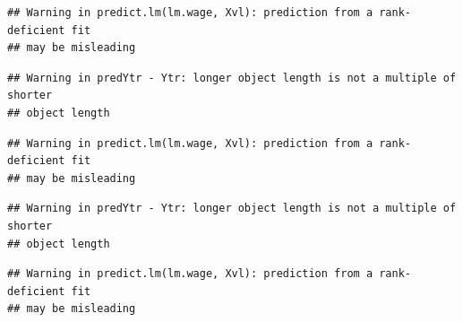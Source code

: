 \documentclass[]{article}
\newenvironment{Shaded}{\begin{snugshade}}{\end{snugshade}}
\newcommand{\KeywordTok}[1]{\textcolor[rgb]{0.13,0.29,0.53}{\textbf{#1}}}
\newcommand{\DataTypeTok}[1]{\textcolor[rgb]{0.13,0.29,0.53}{#1}}
\newcommand{\DecValTok}[1]{\textcolor[rgb]{0.00,0.00,0.81}{#1}}
\newcommand{\StringTok}[1]{\textcolor[rgb]{0.31,0.60,0.02}{#1}}
\newcommand{\OtherTok}[1]{\textcolor[rgb]{0.56,0.35,0.01}{#1}}
\newcommand{\ControlFlowTok}[1]{\textcolor[rgb]{0.13,0.29,0.53}{\textbf{#1}}}
\newcommand{\OperatorTok}[1]{\textcolor[rgb]{0.81,0.36,0.00}{\textbf{#1}}}
\newcommand{\NormalTok}[1]{#1}
\begin{document}
\begin{Shaded}
\end{Shaded}

\begin{verbatim}
## Warning in predict.lm(lm.wage, Xvl): prediction from a rank-deficient fit
## may be misleading
\end{verbatim}

\begin{verbatim}
## Warning in predYtr - Ytr: longer object length is not a multiple of shorter
## object length
\end{verbatim}

\begin{verbatim}
## Warning in predict.lm(lm.wage, Xvl): prediction from a rank-deficient fit
## may be misleading
\end{verbatim}

\begin{verbatim}
## Warning in predYtr - Ytr: longer object length is not a multiple of shorter
## object length
\end{verbatim}

\begin{verbatim}
## Warning in predict.lm(lm.wage, Xvl): prediction from a rank-deficient fit
## may be misleading
\end{verbatim}
\end{document}
